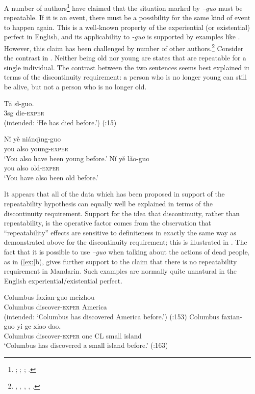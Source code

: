 A number of authors\footnote{\citet{Ma1977}; \citet[230]{LiThompson1981}; \citet{Yeh1996}; \citet[268]{Smith1997}.} have claimed that the situation marked by \textit{–guo} must be repeatable. If it is an event, there must be a possibility for the same kind of event to happen again. This is a well-known property of the experiential (or existential) perfect in English, and its applicability to \textit{-guo} is supported by examples like . However, this claim has been challenged by number of other authors.\footnote{\citet{Chen1979}, \citet{Iljic1990}, \citet[147--148]{XiaoMcEnery2004},  \citet{PanLee2004}, \citet{Lin2007}.} Consider the contrast in . Neither being old nor young are states that are repeatable for a single individual. The contrast between the two sentences seems best explained in terms of the discontinuity requirement: a person who is no longer young can still be alive, but not a person who is no longer old.


\ea
\gll *T\=a  sǐ-guo.\\
 3sg  die-\textsc{exper}\\
\glt (intended: ‘He has died before.’)  (\citealt{Ma1977}:15)
\z

\ea
\ea  \gll Nǐ  yě  niánq\={\i}ng-guo\\
you  also  young-\textsc{exper}\\
\glt ‘You also have been young before.’ 
\ex \gll *Nǐ  yě  lǎo-guo\\
you  also  old-\textsc{exper}\\
\glt ‘You have also been old before.’
\z \z


It appears that all of the data which has been proposed in support of the repeatability hypothesis can equally well be explained in terms of the discontinuity requirement. Support for the idea that discontinuity, rather than repeatability, is the operative factor comes from the observation that “repeatability” effects are sensitive to definiteness in exactly the same way as demonstrated above for the discontinuity requirement; this is illustrated in . The fact that it is possible to use \textit{–guo} when talking about the actions of dead people, as in (\ref{ex:}b), gives further support to the claim that there is no repeatability requirement in Mandarin. Such examples are normally quite unnatural in the English experiential/existential perfect.


\ea
\ea \gll  *Columbus  faxian-guo  meizhou\\
  Columbus  discover-\textsc{exper}  America\\
\glt (intended: ‘Columbus has discovered America before.’)  (\citealt{Yeh1996}:153)
 \ex \gll Columbus  faxian-guo  yi  ge  xiao  dao.\\
Columbus  discover-\textsc{exper}  one  CL  small  island\\
\glt ‘Columbus has discovered a small island before.’  (\citealt{Yeh1996}:163)
\z \z


